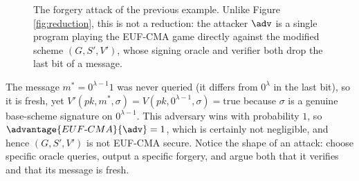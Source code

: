 \documentclass[12pt]{article}
\theoremstyle{definition}
\theoremstyle{remark}
\theoremstyle{definition}
\begin{document}
\begin{figure}[tbhp]
\centering
{}
\caption{The forgery attack of the previous example. Unlike Figure \ref{fig:reduction}, this is not a reduction: the attacker $\adv$ is a single program playing the EUF-CMA game directly against the modified scheme $(G,S',V')$, whose signing oracle and verifier both drop the last bit of a message.\label{fig:attack}}
\end{figure}

The message $m^* = 0^{\lambda-1}1$ was never queried (it differs from $0^\lambda$ in the last bit), so it is fresh, yet $V'(pk, m^*, \sigma) = V(pk, 0^{\lambda-1}, \sigma) = \text{true}$ because $\sigma$ is a genuine base-scheme signature on $0^{\lambda-1}$. This adversary wins with probability $1$, so $\advantage{EUF\text{-}CMA}{\adv} = 1$, which is certainly not negligible, and hence $(G, S', V')$ is not EUF-CMA secure. Notice the shape of an attack: choose specific oracle queries, output a specific forgery, and argue both that it verifies and that its message is fresh.\\
\end{document}
